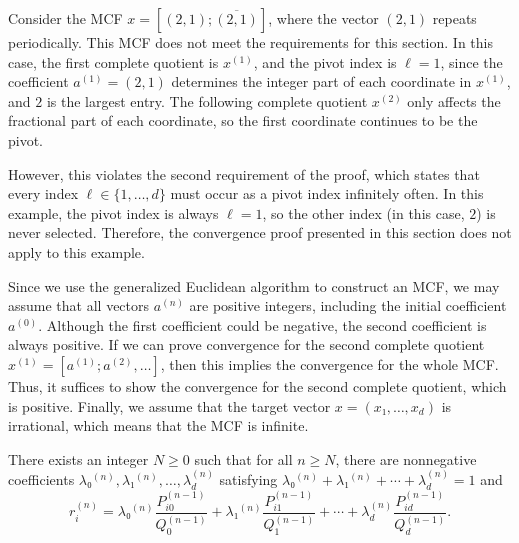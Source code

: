 \begin{example}
  Consider the MCF $x = [(2, 1); \overline{(2, 1)}]$,
  where the vector $(2, 1)$ repeats periodically.
  This MCF does not meet the requirements for this section.
  In this case, the first complete quotient is $x^{(1)}$, and the pivot index is $\ell = 1$,
  since the coefficient $a^{(1)} = (2, 1)$ determines the integer part
  of each coordinate in $x^{(1)}$, and $2$ is the largest entry.
  The following complete quotient $x^{(2)}$ only affects the fractional part
  of each coordinate, so the first coordinate continues to be the pivot.

  However, this violates the second requirement of the proof,
  which states that every index $\ell \in \{1, \dots, d\}$ must occur
  as a pivot index infinitely often.
  In this example, the pivot index is always $\ell = 1$,
  so the other index (in this case, $2$) is never selected.
  Therefore, the convergence proof presented in this section does not apply to this example.
\end{example}

Since we use the generalized Euclidean algorithm to construct an MCF,
we may assume that all vectors $a^{(n)}$ are positive integers,
including the initial coefficient $a^{(0)}$.
Although the first coefficient could be negative,
the second coefficient is always positive.
If we can prove convergence for the second complete quotient $x^{(1)} = [a^{(1)}; a^{(2)}, …]$,
then this implies the convergence for the whole MCF.
Thus, it suffices to show the convergence for the second complete quotient,
which is positive.
Finally, we assume that the target vector $x = (x₁, …, x_d)$ is irrational,
which means that the MCF is infinite.

\begin{lemma}
  \label{lem:conv-conv}
  There exists an integer $N ≥ 0$ such that for all $n ≥ N$,
  there are nonnegative coefficients $λ₀^{(n)}, λ₁^{(n)}, …, λ_d^{(n)}$
  satisfying $λ₀^{(n)} + λ₁^{(n)} + ⋯ + λ_d^{(n)} = 1$ and
  \[
    r_i^{(n)} = λ₀^{(n)} \frac{P_{i0}^{(n-1)}}{Q_0^{(n-1)}} + λ₁^{(n)} \frac{P_{i1}^{(n-1)}}{Q_1^{(n-1)}} + ⋯ + λ_d^{(n)} \frac{P_{id}^{(n-1)}}{Q_d^{(n-1)}}.
  \]
\end{lemma}

